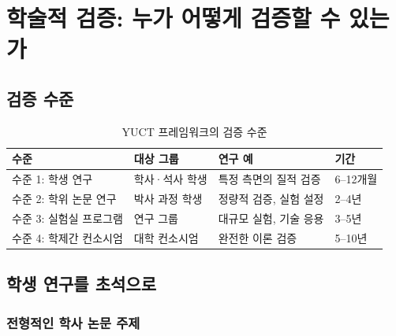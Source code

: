\documentclass[12pt,a4paper]{article}
\begin{document}
	\section{학술적 검증: 누가 어떻게 검증할 수 있는가}
	
	\subsection{검증 수준}
	
	\begin{table}[h]
		\centering
		\begin{tabular}{p{}p{}p{}p{}}
			\toprule
			\textbf{수준} & \textbf{대상 그룹} & \textbf{연구 예} & \textbf{기간} \\
			\midrule
			수준 1: 학생 연구 & 학사·석사 학생 & 특정 측면의 질적 검증 & 6–12개월 \\
			수준 2: 학위 논문 연구 & 박사 과정 학생 & 정량적 검증, 실험 설정 & 2–4년 \\
			수준 3: 실험실 프로그램 & 연구 그룹 & 대규모 실험, 기술 응용 & 3–5년 \\
			수준 4: 학제간 컨소시엄 & 대학 컨소시엄 & 완전한 이론 검증 & 5–10년 \\
			\bottomrule
		\end{tabular}
		\caption{YUCT 프레임워크의 검증 수준}
		\label{tab:verification-levels}
	\end{table}
	
	\subsection{학생 연구를 초석으로}
	
	\subsubsection{전형적인 학사 논문 주제}
	
\end{document}

